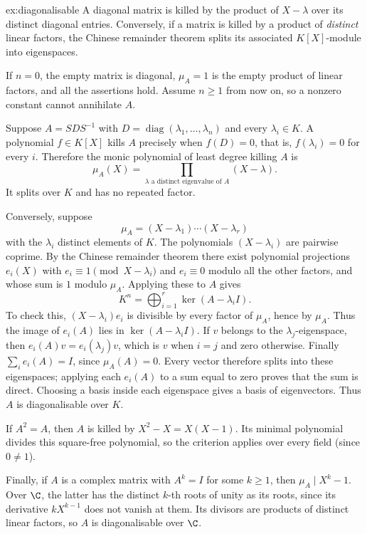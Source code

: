 \begin{solution}{ex:diagonalisable}
\idea A diagonal matrix is killed by the product of $X-\lambda$ over its distinct diagonal entries. Conversely, if a matrix is killed by a product of \emph{distinct} linear factors, the Chinese remainder theorem splits its associated $K[X]$-module into eigenspaces.

\writeup If $n=0$, the empty matrix is diagonal, $\mu_A=1$ is the
empty product of linear factors, and all the assertions hold. Assume
$n\ge1$ from now on, so a nonzero constant cannot annihilate $A$.

Suppose $A=SDS^{-1}$ with $D=\operatorname{diag}(\lambda_1,\ldots,\lambda_n)$ and every $\lambda_i\in K$. A polynomial $f\in K[X]$ kills $A$ precisely when $f(D)=0$, that is, $f(\lambda_i)=0$ for every $i$. Therefore the monic polynomial of least degree killing $A$ is
\[
\mu_A(X)=\prod_{\lambda\text{ a distinct eigenvalue of }A}(X-\lambda).
\]
It splits over $K$ and has no repeated factor.

Conversely, suppose
\[
\mu_A=(X-\lambda_1)\cdots(X-\lambda_r)
\]
with the $\lambda_i$ distinct elements of $K$. The polynomials $(X-\lambda_i)$ are pairwise coprime. By the Chinese remainder theorem there exist polynomial projections $e_i(X)$ with $e_i\equiv1\pmod{X-\lambda_i}$ and $e_i\equiv0$ modulo all the other factors, and whose sum is $1$ modulo $\mu_A$. Applying these to $A$ gives
\[
K^n=\bigoplus_{i=1}^r\ker(A-\lambda_i I).
\]
To check this, $(X-\lambda_i)e_i$ is divisible by every factor of
$\mu_A$, hence by $\mu_A$. Thus the image of $e_i(A)$ lies in
$\ker(A-\lambda_iI)$. If $v$ belongs to the $\lambda_j$-eigenspace,
then $e_i(A)v=e_i(\lambda_j)v$, which is $v$ when $i=j$ and zero
otherwise. Finally $\sum_i e_i(A)=I$, since $\mu_A(A)=0$.
Every vector therefore splits into these eigenspaces; applying each
$e_i(A)$ to a sum equal to zero proves that the sum is direct.
Choosing a basis inside each eigenspace gives a basis of eigenvectors.
Thus $A$ is diagonalisable over $K$.

If $A^2=A$, then $A$ is killed by $X^2-X=X(X-1)$. Its minimal polynomial divides this square-free polynomial, so the criterion applies over every field (since $0\ne1$).

Finally, if $A$ is a complex matrix with $A^k=I$ for some $k\ge1$, then $\mu_A\mid X^k-1$. Over $\C$, the latter has the distinct $k$-th roots of unity as its roots, since its derivative $kX^{k-1}$ does not vanish at them. Its divisors are products of distinct linear factors, so $A$ is diagonalisable over $\C$.
\end{solution}

